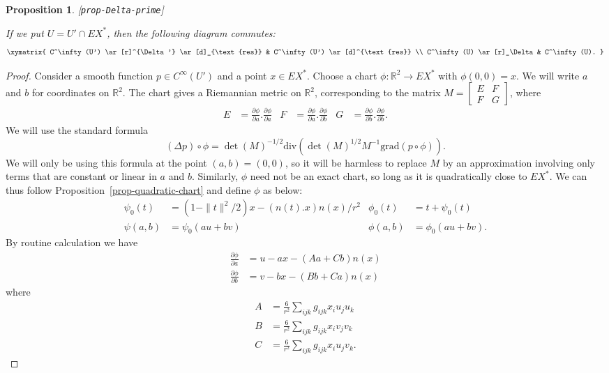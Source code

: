 \documentclass[reqno]{amsart}
\newcommand{\lbl}[1]{\label{#1}\textup{[\texttt{#1}]}\par}
\newcommand{\lbl}{\label}
\newcommand{\Dl}        {\Delta}
\newcommand{\R}         {{\mathbb{R}}}
\newcommand{\bbm}       {\left[\begin{matrix}}
\newcommand{\ebm}       {\end{matrix}\right]}
\renewcommand{\:}{\colon}
\newtheorem{proposition}[theorem]{Proposition}
\theoremstyle{definition}
\begin{document}
\begin{proposition}\lbl{prop-Delta-prime}
 If we put $U=U'\cap EX^*$, then the following diagram commutes:
 \[ \xymatrix{
  C^\infty(U') \ar[r]^{\Dl'} \ar[d]_{\text{res}} &
  C^\infty(U') \ar[d]^{\text{res}} \\
  C^\infty(U) \ar[r]_\Dl &
  C^\infty(U).
 } \]
\end{proposition}
\begin{proof}
 Consider a smooth function $p\in C^\infty(U')$ and a point $x\in EX^*$.
 Choose a chart $\phi\:\R^2\to EX^*$ with $\phi(0,0)=x$.  We will write
 $a$ and $b$ for coordinates on $\R^2$.  The chart gives a Riemannian
 metric on $\R^2$, corresponding to the matrix $M=\bbm E&F\\ F&G\ebm$,
 where
 \begin{align*}
  E &= \frac{\partial \phi}{\partial a} . \frac{\partial \phi}{\partial a} &
  F &= \frac{\partial \phi}{\partial a} . \frac{\partial \phi}{\partial b} &
  G &= \frac{\partial \phi}{\partial b} . \frac{\partial \phi}{\partial b}.
 \end{align*}
 We will use the standard formula
 \[ (\Delta p)\circ\phi =
     \det(M)^{-1/2}
      \text{div}\left(\det(M)^{1/2} M^{-1}\text{grad}(p\circ\phi)\right).
 \]
 We will only be using this formula at the point $(a,b)=(0,0)$, so it
 will be harmless to replace $M$ by an approximation involving only
 terms that are constant or linear in $a$ and $b$.  Similarly, $\phi$
 need not be an exact chart, so long as it is quadratically close to
 $EX^*$.  We can thus follow Proposition~\ref{prop-quadratic-chart} and
 define $\phi$ as below:
 \begin{align*}
  \psi_0(t) &= (1-\|t\|^2/2)x - (n(t).x)n(x)/r^2 &
  \phi_0(t) &= t + \psi_0(t) \\
  \psi(a,b) &= \psi_0(au+bv) &
  \phi(a,b) &= \phi_0(au+bv).
 \end{align*}
 By routine calculation we have
 \begin{align*}
  \frac{\partial\phi}{\partial a} &=
   u - ax - (Aa+Cb) n(x) \\
  \frac{\partial\phi}{\partial b} &=
   v - bx - (Bb+Ca) n(x)
 \end{align*}
 where
 \begin{align*}
  A &= \frac{6}{r^2} \sum_{ijk} g_{ijk}x_iu_ju_k \\
  B &= \frac{6}{r^2} \sum_{ijk} g_{ijk}x_iv_jv_k \\
  C &= \frac{6}{r^2} \sum_{ijk} g_{ijk}x_iu_jv_k.
 \end{align*}

\end{proof}
\end{document}
